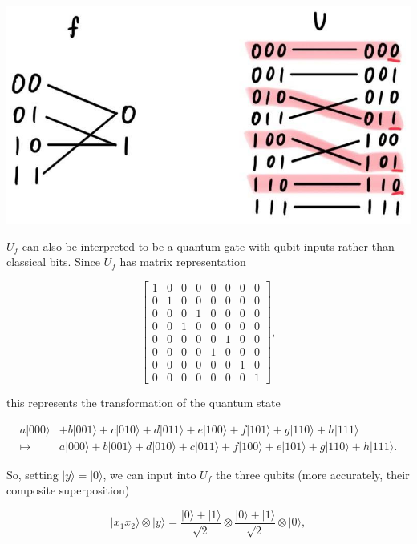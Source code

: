 \documentclass{article}
\theoremstyle{definition}
\begin{document}
      \begin{center}
        \includegraphics[scale=0.3]{img/f_to_U_reversible.jpg}
      \end{center}

      $U_f$ can also be interpreted to be a quantum gate with qubit inputs rather than classical bits. Since $U_f$ has matrix representation

        \[\begin{bmatrix} 1&0&0&0&0&0&0&0\\0&1&0&0&0&0&0&0\\0&0&0&1&0&0&0&0\\0&0&1&0&0&0&0&0\\0&0&0&0&0&1&0&0\\0&0&0&0&1&0&0&0\\0&0&0&0&0&0&1&0\\0&0&0&0&0&0&0&1 \end{bmatrix},\]

      this represents the transformation of the quantum state

      \begin{align*}
        a|000\rangle & + b|001\rangle + c|010\rangle + d |011\rangle + e|100\rangle + f |101\rangle + g|110\rangle + h|111\rangle \\
        \mapsto & a|000\rangle + b|001\rangle + d|010\rangle + c |011\rangle + f|100\rangle + e |101\rangle + g |110\rangle + h|111\rangle.
      \end{align*}

      So, setting $|y\rangle = |0\rangle$, we can input into $U_f$ the three qubits (more accurately, their composite superposition)

        \[|x_1 x_2 \rangle \otimes |y\rangle = \frac{|0\rangle + |1\rangle}{\sqrt{2}} \otimes \frac{|0\rangle + |1\rangle}{\sqrt{2}} \otimes |0\rangle, \]
\end{document}
